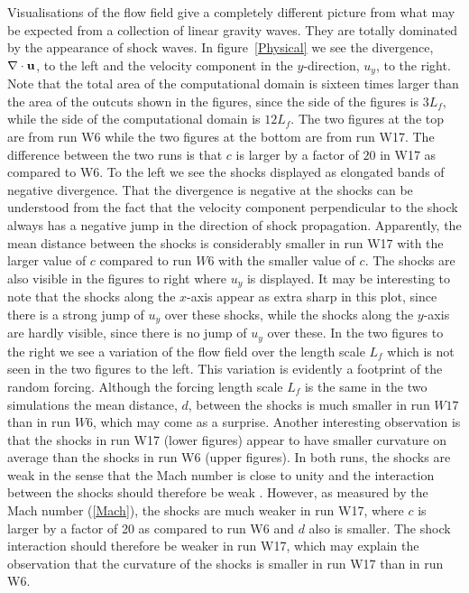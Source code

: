 Visualisations of the flow field give a completely different picture from what
may be expected from a collection of linear gravity waves. They are totally
dominated by the appearance of shock waves. In figure~\ref{Physical} we see
the divergence, $ \nabla \cdot {\bf u} $, to the left and the velocity
component in the $ y $-direction, $ u_y $, to the right.  Note that the total
area of the computational domain is sixteen times larger than the area of the
outcuts shown in the figures, since the side of the figures is $ 3 L_f
$, while the side of the computational domain is $ 12 L_f $.
The two figures at the
top are from run W6 while the two figures at the bottom are from run W17. The
difference between the two runs is that $ c $ is larger by a factor of $ 20 $
in W17 as compared to W6. To the left we see the shocks displayed as elongated
bands of negative divergence. That the divergence is negative at the shocks can
be understood from the fact that the velocity component perpendicular to the
shock always has a negative jump in the direction of shock propagation.
Apparently, the mean distance between the shocks is considerably smaller in run
W17 with the larger value of $ c $ compared to run $ W6 $ with the smaller
value of $ c $.
The shocks are also visible in the figures to right where $ u_y
$ is displayed. It may be interesting to note that the shocks along the $ x
$-axis appear as extra sharp in this plot, since there is a strong jump of $
u_{y} $ over these shocks, while the shocks along the $ y $-axis are hardly
visible, since there is no jump of $ u_{y} $ over these. In the two figures to
the right we see a variation of the flow field over the length scale $ L_f $
which is not seen in the two figures to the left. This variation is evidently a
footprint of the random forcing. Although the forcing length scale $ L_f $ is
the same in the two simulations the mean distance, $ d $, between the shocks is
much smaller in run $ W17 $ than in run $ W6 $, which may come as a surprise. Another interesting observation is that the shocks in run W17 (lower figures) appear to have smaller curvature on average than the shocks in run W6 (upper figures). In both runs, the shocks are weak in the sense that the Mach number is close to unity and the interaction between the shocks should therefore be weak \citep[see][]{ApazidisEliasson2018}. However, as measured by the Mach number  (\ref{Mach}), the shocks are much weaker in run W17, where $ c $ is larger by a factor of 20 as compared to run W6 and $ d $ also is smaller. The shock interaction should therefore be weaker in run W17, which may explain the observation that the curvature of the shocks is smaller in run W17 than in run W6.
